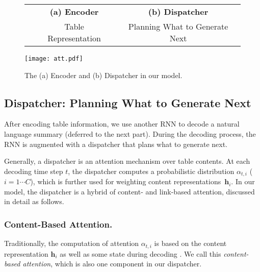 \documentclass[letterpaper]{article} %
\begin{document}
\begin{figure}[!t]
	\begin{center}
		\begin{tabular}{ccc}
		 &\textbf{(a) Encoder} & \textbf{(b) Dispatcher}\\
			&\footnotesize	Table Representation &\footnotesize Planning What to Generate Next
		\end{tabular}
		\texttt{[image: att.pdf]}
		\caption{The (a) Encoder and (b) Dispatcher in our model.}
		\label{fig:arch}
	\end{center}
\end{figure}


\subsection{Dispatcher: Planning What to Generate Next}

After encoding table information, we use another RNN to decode a natural language summary (deferred to the next part). During the decoding process, the RNN is augmented with a dispatcher that plans what to generate next.

Generally, a dispatcher is an attention mechanism over table contents. At each decoding time step $t$, the dispatcher computes a probabilistic distribution $\alpha_{t,i}$ ($i=1\cdots C$), which is further used for weighting content representations~$\bm h_i$.
In our model, the dispatcher is a hybrid of content- and link-based attention, discussed in detail as follows.



\subsubsection{Content-Based Attention.} Traditionally, the computation of attention $\alpha_{t,i}$ is based on the content representation $\bm h_i$ as well as some state during decoding \cite{attention,mei}. We call this \textit{content-based attention}, which is also one component in our dispatcher.
\end{document}
